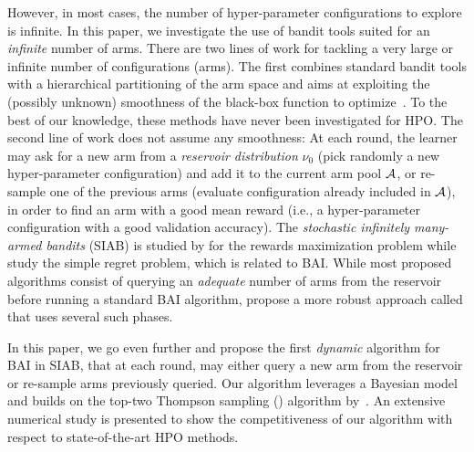 However, in most cases, the number of hyper-parameter configurations to explore is infinite. In this paper, we investigate the use of bandit tools suited for an \emph{infinite} number of arms. There are two lines of work for tackling a very large or infinite number of configurations (arms). The first combines standard bandit tools with a hierarchical partitioning of the arm space and aims at exploiting the (possibly unknown) smoothness of the black-box function to optimize~\citep{bubeck2010x,grill2015poo,shang2019adaptive,bartlett2019simple}. To the best of our knowledge, these methods have never been investigated for HPO. The second line of work does not assume any smoothness: At each round, the learner may ask for a new arm from a \emph{reservoir distribution} $\nu_0$ (pick randomly a new hyper-parameter configuration) and add it to the current arm pool $\mathcal{A}$, or re-sample one of the previous arms (evaluate configuration already included in $\mathcal{A}$), in order to find an arm with a good mean reward (i.e., a hyper-parameter configuration with a good validation accuracy). The \emph{stochastic infinitely many-armed bandits} (SIAB) is studied by \citet{berry1997infinite,wang2008ucbv} for the rewards maximization problem while \citet{carpentier2015siri,aziz2018confidence} %
study the simple regret problem, which is related to BAI. While most proposed algorithms consist of querying an \emph{adequate} number of arms from the reservoir before running a standard BAI algorithm, \cite{li2017hyperband} propose a more robust approach called \Hyperband that uses several such phases.

In this paper, we go even further and propose the first \emph{dynamic} algorithm for BAI in SIAB, that at each round, may either query a new arm from the reservoir or re-sample arms previously queried. Our algorithm leverages a Bayesian model and builds on the top-two Thompson sampling (\TTTS) algorithm by~\citet{russo2016ttts}. %
An extensive numerical study is presented to show the competitiveness of our algorithm with respect to state-of-the-art HPO methods.
